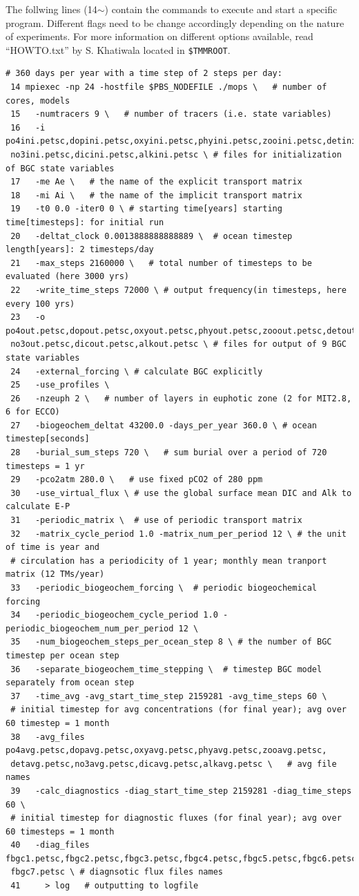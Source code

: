 \documentclass[a4paper]{article}
\begin{document}
The follwing lines (14$\sim$) contain the commands to execute and start a specific program. Different flags need to be change accordingly depending on the nature of experiments. For more information on different options available, read ``HOWTO.txt'' by S. Khatiwala located in \verb|$TMMROOT|. 
\begin{lstlisting}[frame=single,basicstyle=\scriptsize,commentstyle=\color{blue}]
 # 360 days per year with a time step of 2 steps per day:
 14 mpiexec -np 24 -hostfile $PBS_NODEFILE ./mops \   # number of cores, models
 15   -numtracers 9 \   # number of tracers (i.e. state variables)
 16   -i po4ini.petsc,dopini.petsc,oxyini.petsc,phyini.petsc,zooini.petsc,detini.petsc,
 no3ini.petsc,dicini.petsc,alkini.petsc \ # files for initialization of BGC state variables
 17   -me Ae \   # the name of the explicit transport matrix
 18   -mi Ai \   # the name of the implicit transport matrix
 19   -t0 0.0 -iter0 0 \ # starting time[years] starting time[timesteps]: for initial run
 20   -deltat_clock 0.0013888888888889 \  # ocean timestep length[years]: 2 timesteps/day
 21   -max_steps 2160000 \   # total number of timesteps to be evaluated (here 3000 yrs)
 22   -write_time_steps 72000 \ # output frequency(in timesteps, here every 100 yrs)
 23   -o po4out.petsc,dopout.petsc,oxyout.petsc,phyout.petsc,zooout.petsc,detout.petsc,
 no3out.petsc,dicout.petsc,alkout.petsc \ # files for output of 9 BGC state variables
 24   -external_forcing \ # calculate BGC explicitly
 25   -use_profiles \
 26   -nzeuph 2 \   # number of layers in euphotic zone (2 for MIT2.8, 6 for ECCO)
 27   -biogeochem_deltat 43200.0 -days_per_year 360.0 \ # ocean timestep[seconds]
 28   -burial_sum_steps 720 \   # sum burial over a period of 720 timesteps = 1 yr
 29   -pco2atm 280.0 \   # use fixed pCO2 of 280 ppm
 30   -use_virtual_flux \ # use the global surface mean DIC and Alk to calculate E-P
 31   -periodic_matrix \  # use of periodic transport matrix
 32   -matrix_cycle_period 1.0 -matrix_num_per_period 12 \ # the unit of time is year and 
 # circulation has a periodicity of 1 year; monthly mean tranport matrix (12 TMs/year)
 33   -periodic_biogeochem_forcing \  # periodic biogeochemical forcing
 34   -periodic_biogeochem_cycle_period 1.0 -periodic_biogeochem_num_per_period 12 \
 35   -num_biogeochem_steps_per_ocean_step 8 \ # the number of BGC timestep per ocean step
 36   -separate_biogeochem_time_stepping \  # timestep BGC model separately from ocean step
 37   -time_avg -avg_start_time_step 2159281 -avg_time_steps 60 \ 
 # initial timestep for avg concentrations (for final year); avg over 60 timestep = 1 month
 38   -avg_files po4avg.petsc,dopavg.petsc,oxyavg.petsc,phyavg.petsc,zooavg.petsc,
 detavg.petsc,no3avg.petsc,dicavg.petsc,alkavg.petsc \   # avg file names
 39   -calc_diagnostics -diag_start_time_step 2159281 -diag_time_steps 60 \
 # initial timestep for diagnostic fluxes (for final year); avg over 60 timesteps = 1 month
 40   -diag_files fbgc1.petsc,fbgc2.petsc,fbgc3.petsc,fbgc4.petsc,fbgc5.petsc,fbgc6.petsc,
 fbgc7.petsc \ # diagnsotic flux files names
 41     > log   # outputting to logfile
\end{lstlisting}
\end{document}
